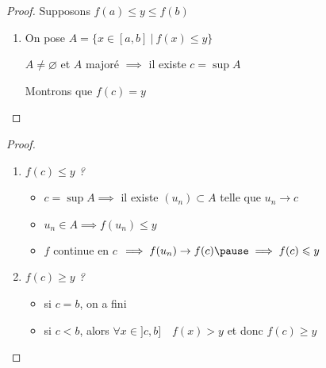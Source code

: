 \begin{frame}
\begin{proof}
Supposons $f(a)\leq y\leq f(b)$\pause

\begin{enumerate}
\item On pose
$
A=\Big\{ x\in [a,b] \ \vert \ f(x)\leq y \Big\}
$

\pause{}
$A\neq \varnothing$ et $A$ majoré \pause{} $\implies$ il existe $c=\sup A$ 

\pause{}
Montrons que $f(c)=y$

\setcounter{saveenumi}{\theenumi}
\end{enumerate}

\pause{}

\end{proof}  
\end{frame}


\begin{frame}
\begin{proof}
\begin{enumerate}
  \setcounter{enumi}{\thesaveenumi}
 \item \pause \emph{$f(c)\leq y$ ?}
   \begin{itemize}
    \item\pause $c=\sup A\implies$ il existe $(u_n) \subset A$ telle que $u_n\to c$
    \item\pause $u_n\in A\implies f(u_n)\leq y$
    \item\pause $f$ continue en $c$ $\implies f(u_n)\to f(c)\pause \implies f(c)\leq y$
  \end{itemize}
  
\item\pause \emph{$f(c)\geq y$ ? }
   \begin{itemize}
    \item\pause si $c=b$, on a fini
    \item\pause si $c<b$, alors $\forall x\in]c,b] \quad f(x)>y $ \pause et donc $ f(c)\geq y$
  \end{itemize}   
\end{enumerate}
\end{proof}

 
  
  
\end{frame}




